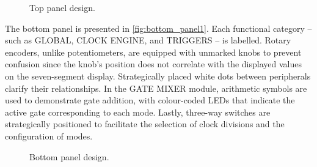 \documentclass[12pt]{article}
\numberwithin{subsubsubsection}{subsubsection}
\begin{document}
\begin{figure}[H]
    \centering
    \caption{Top panel design.}
    \label{fig:top_panel1}
\end{figure}
\newpage
The bottom panel is presented in \autoref{fig:bottom_panel1}. Each functional category – such as GLOBAL, CLOCK ENGINE, and TRIGGERS – is labelled. Rotary encoders, unlike potentiometers, are equipped with unmarked knobs to prevent confusion since the knob's position does not correlate with the displayed values on the seven-segment display. Strategically placed white dots between peripherals clarify their relationships. In the GATE MIXER module, arithmetic symbols are used to demonstrate gate addition, with colour-coded LEDs that indicate the active gate corresponding to each mode. Lastly, three-way switches are strategically positioned to facilitate the selection of clock divisions and the configuration of modes.

\begin{figure}[H]
    \centering
    \caption{Bottom panel design.}
    \label{fig:bottom_panel1}
\end{figure}
\newpage
\end{document}
